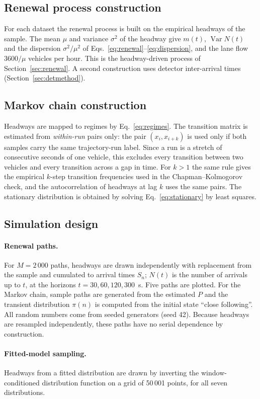 \documentclass[11pt,a4paper]{article}
\numberwithin{equation}{section}
\newcommand{\Var}{\operatorname{Var}}
\begin{document}
\subsection{Renewal process construction}
For each dataset the renewal process is built on the empirical headways of the sample. The mean $\mu$ and variance $\sigma^2$ of the headway give $m(t)$,
$\Var N(t)$ and the dispersion $\sigma^2/\mu^2$ of Eqs.~\eqref{eq:renewal}--\eqref{eq:dispersion}, and the lane flow $3600/\mu$ vehicles per hour. This is the headway-driven process of Section~\ref{sec:renewal}.
A second construction uses detector inter-arrival times (Section~\ref{sec:detmethod}).

\subsection{Markov chain construction}\label{sec:markovmethod}
Headways are mapped to regimes by Eq.~\eqref{eq:regimes}. The transition matrix is estimated from \emph{within-run} pairs only: the pair
$(x_i,x_{i+k})$ is used only if both samples carry the same trajectory-run label. Since a run is a stretch of consecutive seconds of one vehicle, this
excludes every transition between two vehicles and every transition across a gap in time. For $k>1$ the same rule gives the empirical $k$-step transition
frequencies used in the Chapman--Kolmogorov check, and the autocorrelation of headways at lag $k$ uses the same pairs. The stationary distribution is obtained by solving Eq.~\eqref{eq:stationary}
by least squares.

\subsection{Simulation design}\label{sec:simdesign}
\paragraph{Renewal paths.} For $M=2\,000$ paths, headways are drawn independently with replacement from the sample and cumulated to arrival times $S_n$; $N(t)$ is
the number of arrivals up to $t$, at the horizons $t=30,60,120,300$~s. Five paths are plotted. For the Markov chain, sample paths are generated from
the estimated $P$ and the transient distribution $\pi(n)$ is computed from the initial state ``close following''. All random numbers come from seeded generators (seed 42). Because headways are resampled independently, these paths
have no serial dependence by construction.
\paragraph{Fitted-model sampling.} Headways from a fitted distribution are drawn by inverting the window-conditioned distribution function on a
grid of 50\,001 points, for all seven distributions.
\end{document}
